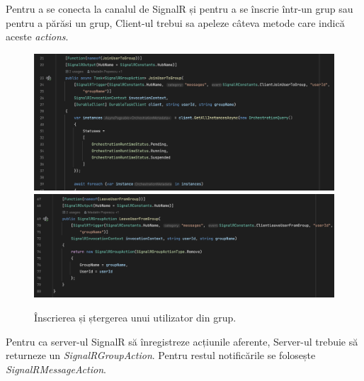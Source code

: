 Pentru a se conecta la canalul de SignalR și pentru a se înscrie într-un grup sau pentru
a părăsi un grup, Client-ul trebui sa apeleze câteva metode care indică aceste \textit{actions}.

\begin{figure}[H]
    \centering
    \includegraphics[width=14cm]{Assets/JoinUser.png}
    \includegraphics[width=14cm]{Assets/RemoveUser.png}
    \caption{Înscrierea și ștergerea unui utilizator din grup.}
    \label{fig:JoinRemoveUser}
\end{figure}

Pentru ca server-ul SignalR să înregistreze acțiunile aferente, Server-ul 
trebuie să returneze un \textit{SignalRGroupAction}. Pentru restul notificările 
se folosește \textit{SignalRMessageAction}.

